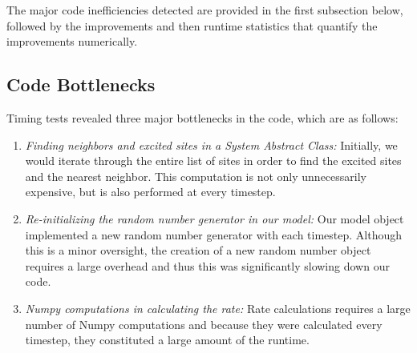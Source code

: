 \documentclass{article}
\begin{document}
\vspace{.15in}
The major code inefficiencies detected are provided in the first subsection below, followed by the improvements and then runtime statistics that quantify the improvements numerically. 


\subsection{Code Bottlenecks}
Timing tests revealed three major bottlenecks in the code, which are as follows:
\begin{enumerate}
    \item \textit{ Finding neighbors and excited sites in a System Abstract Class:} Initially, we would iterate through the entire list of sites in order to find the excited sites and the nearest neighbor. This computation is not only unnecessarily expensive, but is also performed at every timestep. 
    \item \textit{Re-initializing the random number generator in  our model:} Our model object implemented a new random number generator with each timestep. Although this is a minor oversight, the creation of a new random number object requires a large overhead and thus this was significantly slowing down our code.
    \item \textit{Numpy computations in calculating the rate:} Rate calculations requires a large number of Numpy computations and because they were calculated every timestep, they constituted a large amount of the runtime. 
\end{enumerate}
\end{document}
